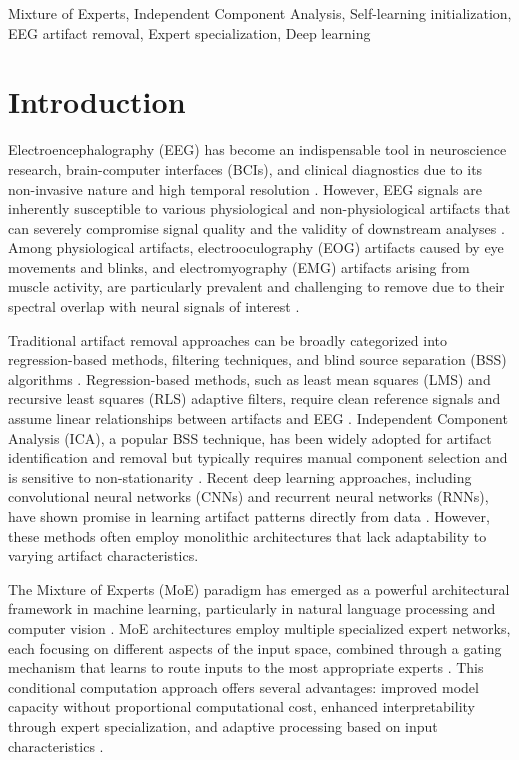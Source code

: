\documentclass[journal]{IEEEtran}
\begin{document}
\begin{IEEEkeywords}
Mixture of Experts, Independent Component Analysis, Self-learning initialization, EEG artifact removal, Expert specialization, Deep learning
\end{IEEEkeywords}

\section{Introduction}
\label{sec:introduction}

Electroencephalography (EEG) has become an indispensable tool in neuroscience research, brain-computer interfaces (BCIs), and clinical diagnostics due to its non-invasive nature and high temporal resolution \cite{teplan2002fundamentals, niedermeyer2005electroencephalography}. However, EEG signals are inherently susceptible to various physiological and non-physiological artifacts that can severely compromise signal quality and the validity of downstream analyses \cite{uriguen2015eeg}. Among physiological artifacts, electrooculography (EOG) artifacts caused by eye movements and blinks, and electromyography (EMG) artifacts arising from muscle activity, are particularly prevalent and challenging to remove due to their spectral overlap with neural signals of interest \cite{fatourechi2007emg, jiang2019removal}.

Traditional artifact removal approaches can be broadly categorized into regression-based methods, filtering techniques, and blind source separation (BSS) algorithms \cite{islam2016methods}. Regression-based methods, such as least mean squares (LMS) and recursive least squares (RLS) adaptive filters, require clean reference signals and assume linear relationships between artifacts and EEG \cite{he2004removal}. Independent Component Analysis (ICA), a popular BSS technique, has been widely adopted for artifact identification and removal but typically requires manual component selection and is sensitive to non-stationarity \cite{jung2000removing, delorme2004eeglab}. Recent deep learning approaches, including convolutional neural networks (CNNs) and recurrent neural networks (RNNs), have shown promise in learning artifact patterns directly from data \cite{yang2018automatic, zhang2021eegdenoisenet}. However, these methods often employ monolithic architectures that lack adaptability to varying artifact characteristics.

The Mixture of Experts (MoE) paradigm has emerged as a powerful architectural framework in machine learning, particularly in natural language processing and computer vision \cite{shazeer2017outrageously, fedus2022switch}. MoE architectures employ multiple specialized expert networks, each focusing on different aspects of the input space, combined through a gating mechanism that learns to route inputs to the most appropriate experts \cite{jacobs1991adaptive}. This conditional computation approach offers several advantages: improved model capacity without proportional computational cost, enhanced interpretability through expert specialization, and adaptive processing based on input characteristics \cite{riquelme2021scaling}.
\end{document}
